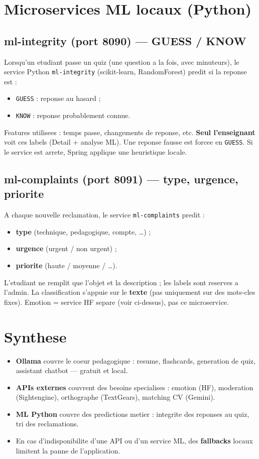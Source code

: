 \section{Microservices ML locaux (Python)}

\subsection{ml-integrity (port 8090) --- GUESS / KNOW}

Lorsqu'un etudiant passe un quiz (une question a la fois, avec minuteurs),
le service Python \texttt{ml-integrity} (scikit-learn, RandomForest) predit
si la reponse est :
\begin{itemize}
  \item \texttt{GUESS} : reponse au hasard ;
  \item \texttt{KNOW} : reponse probablement connue.
\end{itemize}
Features utilisees : temps passe, changements de reponse, etc.
\textbf{Seul l'enseignant} voit ces labels (Detail + analyse ML). Une
reponse fausse est forcee en \texttt{GUESS}. Si le service est arrete, Spring
applique une heuristique locale.

\subsection{ml-complaints (port 8091) --- type, urgence, priorite}

A chaque nouvelle reclamation, le service \texttt{ml-complaints} predit :
\begin{itemize}
  \item \textbf{type} (technique, pedagogique, compte, \ldots) ;
  \item \textbf{urgence} (urgent / non urgent) ;
  \item \textbf{priorite} (haute / moyenne / \ldots).
\end{itemize}
L'etudiant ne remplit que l'objet et la description ; les labels sont
reserves a l'admin. La classification s'appuie sur le \textbf{texte} (pas
uniquement sur des mots-cles fixes). Emotion = service HF separe (voir
ci-dessus), pas ce microservice.

\section{Synthese}

\begin{itemize}
  \item \textbf{Ollama} couvre le coeur pedagogique : resume, flashcards,
        generation de quiz, assistant chatbot --- gratuit et local.
  \item \textbf{APIs externes} couvrent des besoins specialises : emotion
        (HF), moderation (Sightengine), orthographe (TextGears), matching CV
        (Gemini).
  \item \textbf{ML Python} couvre des predictions metier : integrite des
        reponses au quiz, tri des reclamations.
  \item En cas d'indisponibilite d'une API ou d'un service ML, des
        \textbf{fallbacks} locaux limitent la panne de l'application.
\end{itemize}

